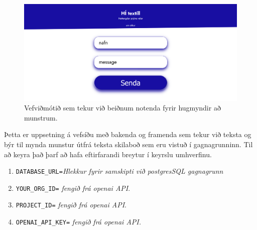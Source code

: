 \begin{enumerate}
\begin{figure}[t]
    \centering
    \includegraphics[width=0.8\linewidth]{myndir/passapnextscreen.png}
    \caption{Vefviðmótið sem tekur við beiðnum notenda fyrir hugmyndir að munstrum.}
    \label{fig:PASSAPMOTOR}
\end{figure}
    Þetta er uppsetning á vefsíðu með bakenda og framenda sem tekur við teksta og býr til mynda munstur útfrá teksta skilaboð sem eru vistuð í gagnagrunninn. Til að keyra það þarf að hafa eftirfarandi breytur í keyrslu umhverfinu.
    \begin{enumerate}
        \item \texttt{DATABASE\_URL=}\textit{Hlekkur fyrir samskipti við postgresSQL gagnagrunn}
        \item \texttt{YOUR\_ORG\_ID=} \textit{fengið frá openai API}.
        \item \texttt{PROJECT\_ID=} \textit{fengið frá openai API}.
        \item \texttt{OPENAI\_API\_KEY=} \textit{fengið frá openai API.}
    \end{enumerate}
\end{enumerate}
